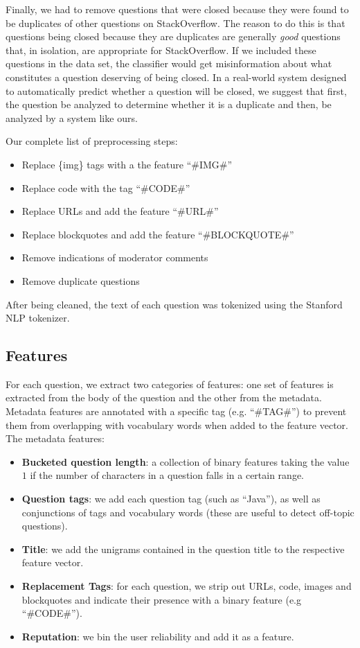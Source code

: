 \documentclass[11pt]{article}
\begin{document}
Finally, we had to remove questions that were closed because they were
found to be duplicates of other questions on StackOverflow.  The
reason to do this is that questions being closed because they are
duplicates are generally \emph{good} questions that, in isolation, are
appropriate for StackOverflow. If we included these questions in the
data set, the classifier would get misinformation about what
constitutes a question deserving of being closed. In a real-world
system designed to automatically predict whether a question will be
closed, we suggest that first, the question be analyzed to determine
whether it is a duplicate and then, be analyzed by a system like ours.

Our complete list of preprocessing steps:

\begin{itemize}
\item Replace \{img\} tags with a the feature ``\#IMG\#''
\item Replace code with the tag ``\#CODE\#''
\item Replace URLs and add the feature ``\#URL\#''
\item Replace blockquotes and add the feature ``\#BLOCKQUOTE\#''
\item Remove indications of moderator comments
\item Remove duplicate questions
\end{itemize}

After being cleaned, the text of each question was tokenized using the Stanford NLP tokenizer.

\subsection{Features}

For each question, we extract two categories of features: one set of
features is extracted from the body of the question and the other from
the metadata. Metadata features are annotated with a specific tag
(e.g. ``\#TAG\#'') to prevent them from overlapping with vocabulary
words when added to the feature vector. The metadata features:

\begin{itemize}
  \item \textbf{Bucketed question length}: a collection of binary
    features taking the value $1$ if the number of characters in a
    question falls in a certain range.
  \item \textbf{Question tags}: we add each question tag (such as
    ``Java''), as well as conjunctions of tags and vocabulary words
    (these are useful to detect off-topic questions).
  \item \textbf{Title}: we add the unigrams contained in the question
    title to the respective feature vector.
  \item \textbf{Replacement Tags}: for each question, we strip out
    URLs, code, images and blockquotes and indicate their presence
    with a binary feature (e.g ``\#CODE\#'').
  \item \textbf{Reputation}: we bin the user reliability and add it as
    a feature.
\end{itemize}
\end{document}
